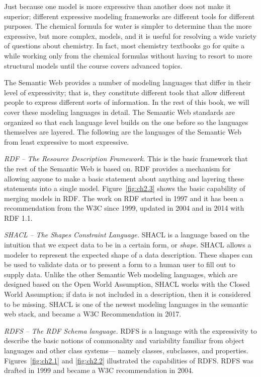 Just because one model is more expressive than another does not make it
superior; different expressive modeling frameworks are different tools
for different purposes. The chemical formula for water is simpler to
determine than the more expressive, but more complex, models, and it is
useful for resolving a wide variety of questions about chemistry. In
fact, most chemistry textbooks go for quite a while working only from
the chemical formulas without having to resort to more structural models
until the course covers advanced topics.

The Semantic Web provides a number of modeling languages that differ in
their level of expressivity; that is, they constitute different tools
that allow different people to express different sorts of information.
In the rest of this book, we will cover these modeling languages in
detail. The Semantic Web standards are organized so that each language
level builds on the one before so the languages themselves are layered.
The following are the languages of the Semantic Web from least
expressive to most expressive.

\emph{RDF} \emph{--} \emph{The Resource Description Framework}. This is
the basic framework that the rest of the Semantic Web is based on. RDF
provides a mechanism for allowing anyone to make a basic statement about
anything and layering these statements into a single model. Figure~\ref{fig:ch2.3}
shows the basic capability of merging models in RDF. The work on RDF
started in 1997 and it has been a recommendation from the W3C since
1999, updated in 2004 and in 2014 with RDF 1.1.

\emph{SHACL} \emph{-- The Shapes Constraint Language.} SHACL is a language
based on the intuition that we expect data to be in a certain form, or \emph{shape}.
SHACL allows a modeler to represent the expected shape of a data description. These shapes can be
used to validate data or to present a form to a human user to fill out to supply data.
Unlike the other Semantic Web modeling languages, which are designed based on the Open 
World Assumption, SHACL works with the Closed World Assumption; if data is not 
included in  a description, then it is considered to be missing. 
SHACL is one of the newest modeling languages in the semantic web stack, and became a
W3C Recommendation in 2017. 

\emph{RDFS} \emph{-- The RDF Schema language.} RDFS is a language with
the expressivity to describe the basic notions of commonality and
variability familiar from object languages and other class systems---
namely classes, subclasses, and properties. Figures~\ref{fig:ch2.1} and \ref{fig:ch2.2}
illustrated the capabilities of RDFS. RDFS was drafted in 1999 and
became a W3C recommendation in 2004.

